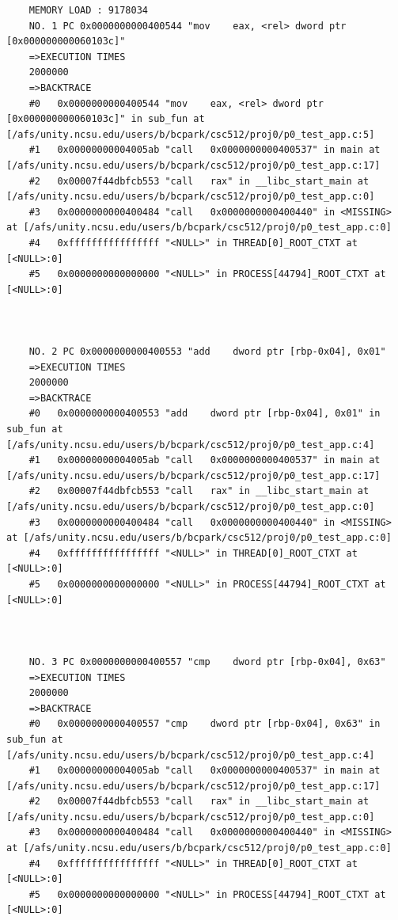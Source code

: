 \documentclass[11pt]{article}
\begin{document}
\begin{verbatim}
    MEMORY LOAD : 9178034
    NO. 1 PC 0x0000000000400544 "mov    eax, <rel> dword ptr [0x000000000060103c]"
    =>EXECUTION TIMES
    2000000
    =>BACKTRACE
    #0   0x0000000000400544 "mov    eax, <rel> dword ptr [0x000000000060103c]" in sub_fun at [/afs/unity.ncsu.edu/users/b/bcpark/csc512/proj0/p0_test_app.c:5]
    #1   0x00000000004005ab "call   0x0000000000400537" in main at [/afs/unity.ncsu.edu/users/b/bcpark/csc512/proj0/p0_test_app.c:17]
    #2   0x00007f44dbfcb553 "call   rax" in __libc_start_main at [/afs/unity.ncsu.edu/users/b/bcpark/csc512/proj0/p0_test_app.c:0]
    #3   0x0000000000400484 "call   0x0000000000400440" in <MISSING> at [/afs/unity.ncsu.edu/users/b/bcpark/csc512/proj0/p0_test_app.c:0]
    #4   0xffffffffffffffff "<NULL>" in THREAD[0]_ROOT_CTXT at [<NULL>:0]
    #5   0x0000000000000000 "<NULL>" in PROCESS[44794]_ROOT_CTXT at [<NULL>:0]
    
    
    
    NO. 2 PC 0x0000000000400553 "add    dword ptr [rbp-0x04], 0x01"
    =>EXECUTION TIMES
    2000000
    =>BACKTRACE
    #0   0x0000000000400553 "add    dword ptr [rbp-0x04], 0x01" in sub_fun at [/afs/unity.ncsu.edu/users/b/bcpark/csc512/proj0/p0_test_app.c:4]
    #1   0x00000000004005ab "call   0x0000000000400537" in main at [/afs/unity.ncsu.edu/users/b/bcpark/csc512/proj0/p0_test_app.c:17]
    #2   0x00007f44dbfcb553 "call   rax" in __libc_start_main at [/afs/unity.ncsu.edu/users/b/bcpark/csc512/proj0/p0_test_app.c:0]
    #3   0x0000000000400484 "call   0x0000000000400440" in <MISSING> at [/afs/unity.ncsu.edu/users/b/bcpark/csc512/proj0/p0_test_app.c:0]
    #4   0xffffffffffffffff "<NULL>" in THREAD[0]_ROOT_CTXT at [<NULL>:0]
    #5   0x0000000000000000 "<NULL>" in PROCESS[44794]_ROOT_CTXT at [<NULL>:0]
    
    
    
    NO. 3 PC 0x0000000000400557 "cmp    dword ptr [rbp-0x04], 0x63"
    =>EXECUTION TIMES
    2000000
    =>BACKTRACE
    #0   0x0000000000400557 "cmp    dword ptr [rbp-0x04], 0x63" in sub_fun at [/afs/unity.ncsu.edu/users/b/bcpark/csc512/proj0/p0_test_app.c:4]
    #1   0x00000000004005ab "call   0x0000000000400537" in main at [/afs/unity.ncsu.edu/users/b/bcpark/csc512/proj0/p0_test_app.c:17]
    #2   0x00007f44dbfcb553 "call   rax" in __libc_start_main at [/afs/unity.ncsu.edu/users/b/bcpark/csc512/proj0/p0_test_app.c:0]
    #3   0x0000000000400484 "call   0x0000000000400440" in <MISSING> at [/afs/unity.ncsu.edu/users/b/bcpark/csc512/proj0/p0_test_app.c:0]
    #4   0xffffffffffffffff "<NULL>" in THREAD[0]_ROOT_CTXT at [<NULL>:0]
    #5   0x0000000000000000 "<NULL>" in PROCESS[44794]_ROOT_CTXT at [<NULL>:0]
    

\end{verbatim}
\end{document}
